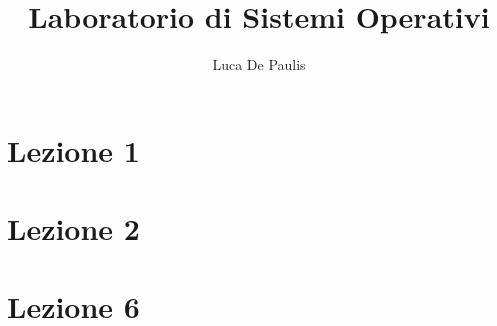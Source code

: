 \documentclass[
    oneside,
    10pt,
    language=italian,
    pagestyle=notes,
    fontstyle=palaeuler,
    thmstyle=boxed,
    colors
]{modernth}
\begin{document}
\author{Luca De Paulis}
\title{Laboratorio di Sistemi Operativi}
\maketitle

\frontmatter{}
\tableofcontents

\mainmatter{}

\chapter{Lezione 1}


\chapter{Lezione 2}





\chapter{Lezione 6}





\end{document}
